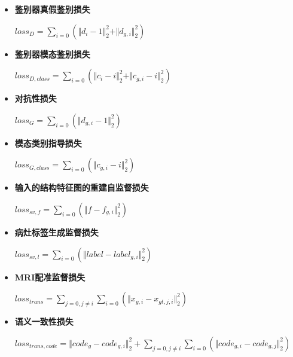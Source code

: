 \documentclass[letterpaper]{article} %
\begin{document}
\begin{itemize}
	\item \textbf{鉴别器真假鉴别损失}
	\begin{center}
		$loss_{D}=\sum\limits_{i=0}(\Vert{d_{i}-1}\Vert_{2}^{2}+\Vert{d_{g,i}}\Vert_{2}^{2})$
	\end{center}

	\item \textbf{鉴别器模态鉴别损失}
	\begin{center}
	$loss_{D,class}=\sum\limits_{i=0}(\Vert{c_{i}-i}\Vert_{2}^{2}+\Vert{c_{g,i}-i}\Vert_{2}^{2})$
	\end{center}

	\item \textbf{对抗性损失}
	\begin{center}
		$loss_{G}=\sum\limits_{i=0}(\Vert{d_{g,i}-1}\Vert_{2}^{2})$
	\end{center}
	
	\item \textbf{模态类别指导损失}
	\begin{center}
		$loss_{G,class}=\sum\limits_{i=0}(\Vert{c_{g,i}-i}\Vert_{2}^{2})$
	\end{center}
	
	\item \textbf{输入的结构特征图的重建自监督损失}
	\begin{center}
		$loss_{sv,f}=\sum\limits_{i=0}(\Vert{f-f_{g,i}}\Vert_{2}^{2})$
	\end{center}
	
	\item \textbf{病灶标签生成监督损失}
	\begin{center}
		$loss_{sv,l}=\sum\limits_{i=0}(\Vert{label-label_{g,i}}\Vert_{2}^{2})$
	\end{center}
	
	\item \textbf{MRI配准监督损失}
	\begin{center}
		$loss_{trans}=\sum\limits_{j=0,j\neq i}\sum\limits_{i=0}(\Vert{x_{g,i}-x_{gt,j,i}}\Vert_{2}^{2})$
	\end{center}
	
	\item \textbf{语义一致性损失}
	\begin{center}
		$loss_{trans,code}=\Vert{code_g-code_{g,i}}\Vert_{2}^{2}+\sum\limits_{j=0,j\neq i}\sum\limits_{i=0}(\Vert{code_{g,i}-code_{g,j}}\Vert_{2}^{2})$
	\end{center}
	
\end{itemize}
\end{document}
